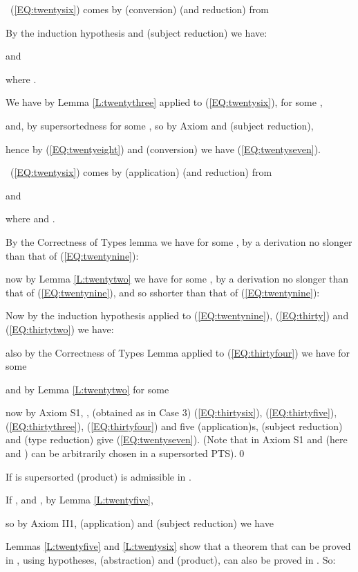 \documentclass{LMCS}
\begin{document}
\begin{thm}
{\ (\ref{EQ:twentysix}) comes by (conversion) (and reduction) from

  By the induction hypothesis and (subject reduction) we have:

  and

  where .

  We have by Lemma \ref{L:twentythree} applied to (\ref{EQ:twentysix}), for some ,

  and, by supersortedness  for some
  , so by Axiom  and (subject reduction),

  hence by (\ref{EQ:twentyeight}) and (conversion) we have
  (\ref{EQ:twentyseven}).

\ (\ref{EQ:twentysix}) comes by (application) (and reduction) from

  and

  where  and .

  By the Correctness of Types lemma we have for some , by a derivation no slonger than that of (\ref{EQ:twentynine}):

  now by Lemma \ref{L:twentytwo} we have for some , by a
  derivation no slonger than that of (\ref{EQ:twentynine}), and so sshorter than that
  of (\ref{EQ:twentynine}):

  Now by the induction hypothesis applied to (\ref{EQ:twentynine}),
  (\ref{EQ:thirty}) and (\ref{EQ:thirtytwo}) we have:



  also by the Correctness of Types Lemma applied to
  (\ref{EQ:thirtyfour}) we have for some 

  and by Lemma \ref{L:twentytwo} for some 

  now by Axiom S1, , (obtained as in Case 3)
  (\ref{EQ:thirtysix}), (\ref{EQ:thirtyfive}), (\ref{EQ:thirtythree}),
  (\ref{EQ:thirtyfour}) and five (application)s, (subject reduction)
  and (type reduction) give (\ref{EQ:twentyseven}). (Note that in
  Axiom S1  and  (here  and ) can be
  arbitrarily chosen in a supersorted PTS).\qed

\begin{lem}\label{L:twentysix}
  If  is supersorted (product) is admissible in .
\end{lem}

\proof If , 
 and , by Lemma \ref{L:twentyfive},

  so by Axiom II1, (application) and (subject reduction) we have


  Lemmas \ref{L:twentyfive} and \ref{L:twentysix} show that a theorem that can be proved in , using hypotheses, (abstraction) and (product), can also be
  proved in . So:

}
\end{thm}
\end{document}

